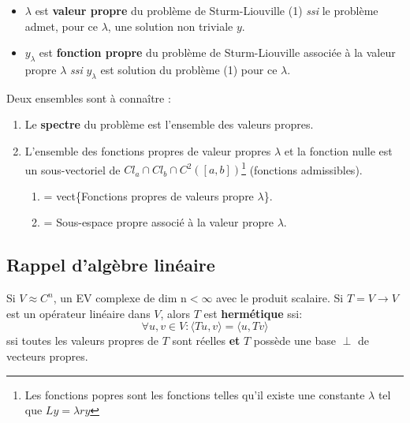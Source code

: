 \documentclass	[11pt, a4paper, openany]{book}
\begin{document}
\begin{itemize}
\item $\lambda$ est \textbf{valeur propre} du problème de Sturm-Liouville  (1) \textit{ssi} le problème admet, pour ce $\lambda$, une solution non triviale $y$.
\item $y_\lambda$ est \textbf{fonction propre} du problème de Sturm-Liouville associée à la valeur propre $\lambda$ \textit{ssi} $y_\lambda$ est solution du problème (1) pour ce $\lambda$.
\end{itemize}
Deux ensembles sont à connaître :
\begin{enumerate}
\item Le \textbf{spectre} du problème est l'ensemble des valeurs propres. 
\item L'ensemble des fonctions propres de valeur propres $\lambda$ et la fonction nulle est un sous-vectoriel de $Cl_a\cap Cl_b \cap C^2([a,b])$\footnote{Les fonctions popres sont les fonctions telles qu'il existe une constante $\lambda$ tel que $Ly = \lambda r y$} (fonctions admissibles).\begin{enumerate}
\item = vect\{Fonctions propres de valeurs propre $\lambda$\}.
\item = Sous-espace propre associé à la valeur propre $\lambda$.
\end{enumerate}
\end{enumerate}

\subsection{Rappel d'algèbre linéaire}
Si $V \approx C^n$, un EV complexe de dim n$< \infty$ avec le produit scalaire. Si $T = V \rightarrow V$ est un opérateur linéaire dans $V$, alors $T$ est \textbf{hermétique} ssi:
\begin{equation}
\forall u,v \in V : \langle Tu,v \rangle = \langle u,Tv\rangle
\end{equation}
ssi toutes les valeurs propres de $T$ sont réelles \textbf{et} $T$ possède une base $\perp$ de vecteurs propres.
\end{document}
